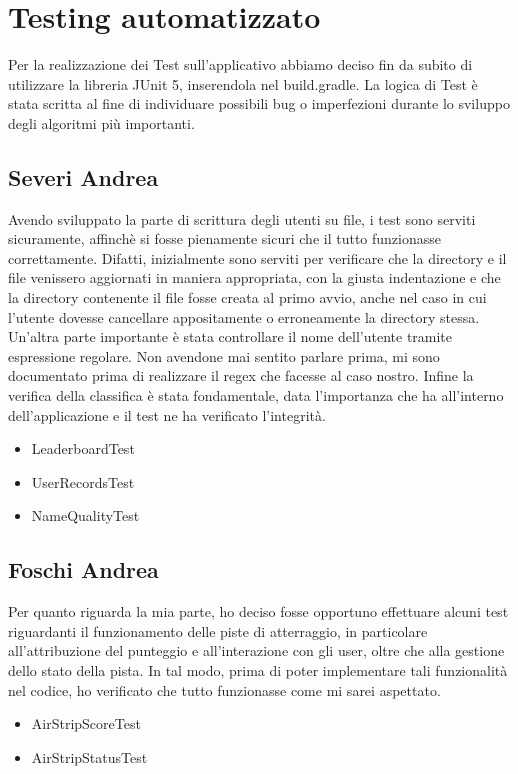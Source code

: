\documentclass[a4paper,12pt]{report}
\begin{document}
\section{Testing automatizzato}
Per la realizzazione dei Test sull’applicativo abbiamo deciso fin da subito di utilizzare la libreria JUnit 5, inserendola nel build.gradle.
La logica di Test è stata scritta al fine di individuare possibili bug o imperfezioni durante lo sviluppo degli algoritmi più importanti.

\subsection{Severi Andrea}
Avendo sviluppato la parte di scrittura degli utenti su file, i test sono serviti sicuramente, affinchè si fosse pienamente sicuri che il tutto funzionasse correttamente. Difatti, inizialmente sono serviti per
verificare che la directory e il file venissero aggiornati in maniera appropriata, con la giusta indentazione e che la directory contenente il file fosse creata al primo avvio, anche nel caso in cui l'utente dovesse cancellare appositamente o erroneamente la directory stessa. Un'altra parte importante è stata controllare il nome dell'utente tramite espressione regolare. Non avendone mai sentito parlare prima, mi sono documentato prima di realizzare il regex che facesse al caso nostro. Infine la verifica della classifica è stata fondamentale, data l'importanza che ha all'interno dell'applicazione e il test ne ha verificato l'integrità.
\begin{itemize}
    \item LeaderboardTest
    \item UserRecordsTest
    \item NameQualityTest
\end{itemize}

\subsection{Foschi Andrea}
Per quanto riguarda la mia parte, ho deciso fosse opportuno effettuare alcuni test riguardanti il funzionamento delle piste di atterraggio, in particolare all’attribuzione del punteggio e all’interazione con gli user, oltre che alla gestione dello stato della pista. In tal modo, prima di poter implementare tali funzionalità nel codice, ho verificato che tutto funzionasse come mi sarei aspettato.
\begin{itemize}
    \item AirStripScoreTest
    \item AirStripStatusTest
\end{itemize}
\end{document}
